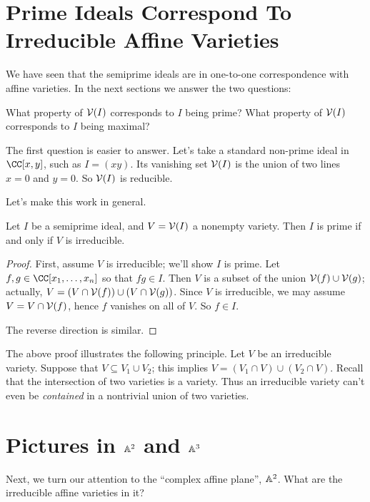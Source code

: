 \section{Prime Ideals Correspond To Irreducible Affine Varieties}
We have seen that the semiprime ideals are in one-to-one correspondence with affine varieties.
In the next sections we answer the two questions:
\begin{itemize}
	\ii What property of $\mathcal V(I)$ corresponds to $I$ being prime?
	\ii What property of $\mathcal V(I)$ corresponds to $I$ being maximal?
\end{itemize}
The first question is easier to answer.
Let's take a standard non-prime ideal in $\CC[x,y]$, such as $I = (xy)$.
Its vanishing set $\mathcal V(I)$ is the union of two lines $x=0$ and $y=0$.
So $\mathcal V(I)$ is reducible.

Let's make this work in general.
\begin{theorem}
	Let $I$ be a semiprime ideal, and $V = \mathcal V(I)$ a nonempty variety.
	Then $I$ is prime if and only if $V$ is irreducible.
\end{theorem}
\begin{proof}
	First, assume $V$ is irreducible; we'll show $I$ is prime.
	Let $f,g \in \CC[x_1, \dots, x_n]$ so that $fg \in I$.
	Then $V$ is a subset of the union $\mathcal V(f) \cup \mathcal V(g)$;
	actually, $V = \left( V \cap \mathcal V(f) \right) \cup \left( V \cap \mathcal V(g) \right)$.
	Since $V$ is irreducible, we may assume $V = V \cap \mathcal V(f)$,
	hence $f$ vanishes on all of $V$. So $f \in I$.

	The reverse direction is similar.
\end{proof}

\begin{remark}
	The above proof illustrates the following principle.
	Let $V$ be an irreducible variety.
	Suppose that $V \subseteq V_1 \cup V_2$;
	this implies $V = (V_1 \cap V) \cup (V_2 \cap V)$.
	Recall that the intersection of two varieties is a variety.
	Thus an irreducible variety can't even be \emph{contained}
	in a nontrivial union of two varieties.
\end{remark}

\section{Pictures in $\mathbb A^2$ and $\mathbb A^3$}
Next, we turn our attention to the ``complex affine plane'', $\mathbb A^2$.
What are the irreducible affine varieties in it?

